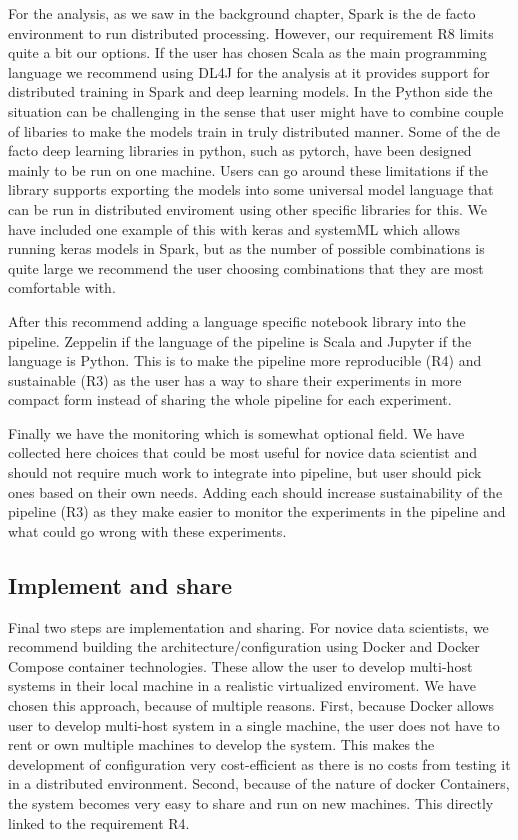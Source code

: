For the analysis, as we saw in the background chapter, Spark is the de facto environment to run distributed processing.
However, our requirement R8 limits quite a bit our options.
If the user has chosen Scala as the main programming language we recommend using DL4J for the analysis at it provides support for distributed training in Spark and deep learning models.
In the Python side the situation can be challenging in the sense that user might have to combine couple of libaries to make the models train in truly distributed manner.
Some of the de facto deep learning libraries in python, such as pytorch, have been designed mainly to be run on one machine.
Users can go around these limitations if the library supports exporting the models into some universal model language that can be run in distributed enviroment using other specific libraries for this.
We have included one example of this with keras and systemML which allows running keras models in Spark, but as the number of possible combinations is quite large we recommend the user choosing combinations that they are most comfortable with.

After this recommend adding a language specific notebook library into the pipeline.
Zeppelin if the language of the pipeline is Scala and Jupyter if the language is Python.
This is to make the pipeline more reproducible (R4) and sustainable (R3) as the user has a way to share their experiments in more compact form instead of sharing the whole pipeline for each experiment.

Finally we have the monitoring which is somewhat optional field.
We have collected here choices that could be most useful for novice data scientist and should not require much work to integrate into pipeline, but user should pick ones based on their own needs.
Adding each should increase sustainability of the pipeline (R3) as they make easier to monitor the experiments in the pipeline and what could go wrong with these experiments.

\subsection{Implement and share}

Final two steps are implementation and sharing.
For novice data scientists, we recommend building the architecture/configuration using Docker and Docker Compose container technologies.
These allow the user to develop multi-host systems in their local machine in a realistic virtualized enviroment.
We have chosen this approach, because of multiple reasons.
First, because Docker allows user to develop multi-host system in a single machine, the user does not have to rent or own multiple machines to develop the system.
This makes the development of configuration very cost-efficient as there is no costs from testing it in a distributed environment.
Second, because of the nature of docker Containers, the system becomes very easy to share and run on new machines.
This directly linked to the requirement R4.

